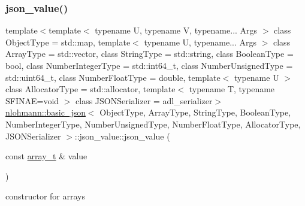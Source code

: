 \subsubsection{\texorpdfstring{json\+\_\+value()}{json\_value()}\hspace{0.1cm}{\footnotesize\ttfamily [11/12]}}
{\footnotesize\ttfamily template$<$template$<$ typename U, typename V, typename... Args $>$ class Object\+Type = std\+::map, template$<$ typename U, typename... Args $>$ class Array\+Type = std\+::vector, class String\+Type  = std\+::string, class Boolean\+Type  = bool, class Number\+Integer\+Type  = std\+::int64\+\_\+t, class Number\+Unsigned\+Type  = std\+::uint64\+\_\+t, class Number\+Float\+Type  = double, template$<$ typename U $>$ class Allocator\+Type = std\+::allocator, template$<$ typename T, typename S\+F\+I\+N\+A\+E=void $>$ class J\+S\+O\+N\+Serializer = adl\+\_\+serializer$>$ \\
\hyperlink{classnlohmann_1_1basic__json}{nlohmann\+::basic\+\_\+json}$<$ Object\+Type, Array\+Type, String\+Type, Boolean\+Type, Number\+Integer\+Type, Number\+Unsigned\+Type, Number\+Float\+Type, Allocator\+Type, J\+S\+O\+N\+Serializer $>$\+::json\+\_\+value\+::json\+\_\+value (\begin{DoxyParamCaption}\item[{const \hyperlink{classnlohmann_1_1basic__json_ae095578e03df97c5b3991787f1056374}{array\+\_\+t} \&}]{value }\end{DoxyParamCaption})\hspace{0.3cm}{\ttfamily [inline]}}



constructor for arrays 

\mbox{\label{unionnlohmann_1_1basic__json_1_1json__value_a69cd49ed5ddf12af184de009c38e90b4}} 
